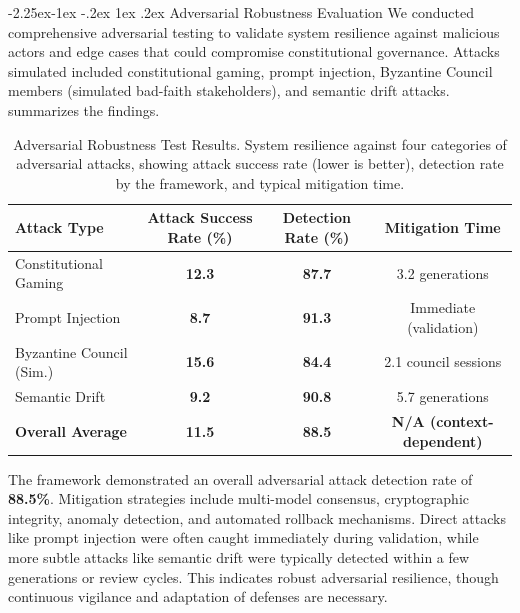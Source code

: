 \documentclass[manuscript,screen,review,anonymous,9pt]{acmart}
\makeatletter
\renewcommand\subsection{\@startsection{subsection}{2}{\z@}%
  {-2.25ex\@plus -1ex \@minus -.2ex}%
  {1ex \@plus .2ex}%
  {\normalfont\large\bfseries}}
\newcommand{\tablesize}{\footnotesize} %
\newcommand{\tablenumfmt}[1]{\textbf{#1}}
\makeatother
\begin{document}
\subsection{Adversarial Robustness Evaluation}
\label{subsec:adversarial_robustness_discussion}
We conducted comprehensive adversarial testing to validate system resilience against malicious actors and edge cases that could compromise constitutional governance. Attacks simulated included constitutional gaming, prompt injection, Byzantine Council members (simulated bad-faith stakeholders), and semantic drift attacks.  summarizes the findings.
\begin{table}[htbp]
\centering
\caption{Adversarial Robustness Test Results. System resilience against four categories of adversarial attacks, showing attack success rate (lower is better), detection rate by the framework, and typical mitigation time.}
\label{tab:adversarial_results}
\tablesize
\begin{tabular}{@{}lccc@{}}
\toprule
\textbf{Attack Type} & \textbf{Attack Success Rate (\%)} & \textbf{Detection Rate (\%)} & \textbf{Mitigation Time} \\
\midrule
Constitutional Gaming & \tablenumfmt{12.3} & \tablenumfmt{87.7} & 3.2 generations \\
Prompt Injection      & \tablenumfmt{8.7}  & \tablenumfmt{91.3} & Immediate (validation) \\
Byzantine Council (Sim.) & \tablenumfmt{15.6} & \tablenumfmt{84.4} & 2.1 council sessions \\
Semantic Drift        & \tablenumfmt{9.2}  & \tablenumfmt{90.8} & 5.7 generations \\
\midrule
\textbf{Overall Average} & \textbf{\tablenumfmt{11.5}} & \textbf{\tablenumfmt{88.5}} & \textbf{N/A (context-dependent)} \\
\bottomrule
\end{tabular}
\end{table}
The framework demonstrated an overall adversarial attack detection rate of \textbf{88.5\%}. Mitigation strategies include multi-model consensus, cryptographic integrity, anomaly detection, and automated rollback mechanisms. Direct attacks like prompt injection were often caught immediately during validation, while more subtle attacks like semantic drift were typically detected within a few generations or review cycles. This indicates robust adversarial resilience, though continuous vigilance and adaptation of defenses are necessary.
\end{document}
